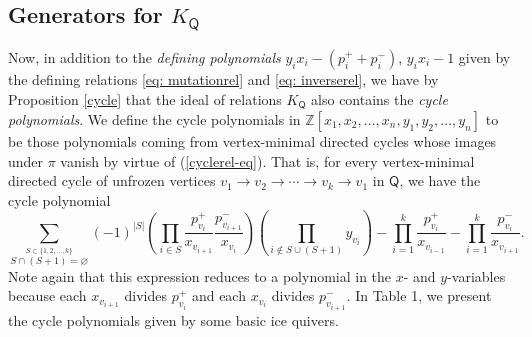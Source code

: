 \documentclass[10pt]{amsart}
\numberwithin{equation}{section}
\theoremstyle{definition}
\theoremstyle{remark}
\newcommand{\Z}{\mathbb{Z}}
\renewcommand{\emptyset}{\varnothing}
\newcommand{\1}{^{-1}}
\def\Q{\mathsf{Q}}
\begin{document}
\subsection{Generators for $K_\Q$}\label{sect:generators}
Now, in addition to the \textit{defining polynomials} $y_ix_i - (p_i^+ + p_i^-)$, $y_ix_i - 1$ given by the defining relations \eqref{eq: mutationrel} and \eqref{eq: inverserel}, we have by Proposition \ref{cycle} that the ideal of relations $K_\Q$ also contains the \textit{cycle polynomials}. We define the cycle polynomials in $\Z[x_1,x_2,\dots,x_n,y_1,y_2,\dots,y_n]$ to be those polynomials coming from vertex-minimal directed cycles whose images under $\pi$ vanish by virtue of (\ref{cyclerel-eq}). That is, for every vertex-minimal  directed cycle of unfrozen vertices $v_1 \to v_2 \to \cdots \to v_k \to v_1$ in $\Q$, we have the cycle polynomial
\[
\sum_{\stackrel{S\subset \{1,2,\dots,k\}}{S\cap (S+1)=\emptyset}} (-1)^{|S|}\left(\prod_{i\in S} \frac{p_{v_i}^+}{x_{v_{i+1}}}\frac{p_{v_{i+1}}^-}{x_{v_i}}\right)\left(\prod_{i\not\in S\cup (S+1)} y_{v_i}\right) - \prod_{i=1}^k\frac{p_{v_i}^+}{x_{v_{i-1}}}- \prod_{i=1}^k\frac{p_{v_i}^-}{x_{v_{i+1}}}.
\]
Note again that this expression reduces to a polynomial in the $x$- and $y$-variables because each $x_{v_{i+1}}$ divides $p_{v_i}^+$ and each $x_{v_i}$ divides $p_{v_{i+1}}^-$. In Table 1, we present the cycle polynomials given by some basic ice quivers.
\end{document}
